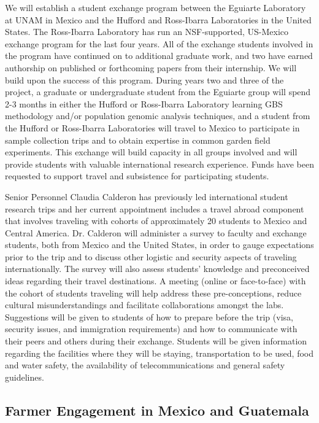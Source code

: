 We will establish a student exchange program between the Eguiarte Laboratory at UNAM in Mexico and the Hufford and Ross-Ibarra Laboratories in the United States.
The Ross-Ibarra Laboratory has run an NSF-supported, US-Mexico exchange program for the last four years.  
All of the exchange students involved in the program have continued on to additional graduate work, and two have earned authorship on published or forthcoming papers from their internship.  
We will build upon the success of this program.
During years two and three of the project, a graduate or undergraduate student from the Eguiarte group will spend 2-3 months in either the Hufford or Ross-Ibarra Laboratory learning GBS methodology and/or population genomic analysis techniques, and a student from the Hufford or Ross-Ibarra Laboratories will travel to Mexico to participate in sample collection trips and to obtain expertise in common garden field experiments. 
This exchange will build capacity in all groups involved and will provide students with valuable international research experience. 
Funds have been requested to support travel and subsistence for participating students. 

Senior Personnel Claudia Calderon has previously led international student research trips and her current appointment includes a travel abroad component that involves traveling with cohorts of approximately 20 students to Mexico and Central America.
Dr. Calderon will administer a survey to faculty and exchange students, both from Mexico and the United States, in order to gauge expectations prior to the trip and to discuss other logistic and security aspects of traveling internationally.
The survey will also assess students' knowledge and preconceived ideas regarding their travel destinations.
A meeting (online or face-to-face) with the cohort of students traveling will help address these pre-conceptions, reduce cultural misunderstandings and facilitate collaborations amongst the labs.
Suggestions will be given to students of how to prepare before the trip (visa, security issues, and immigration requirements) and how to communicate with their peers and others during their exchange.
Students will be given information regarding the facilities where they will be staying, transportation to be used, food and water safety, the availability of telecommunications and general safety guidelines.

\subsection*{Farmer Engagement in Mexico and Guatemala}

